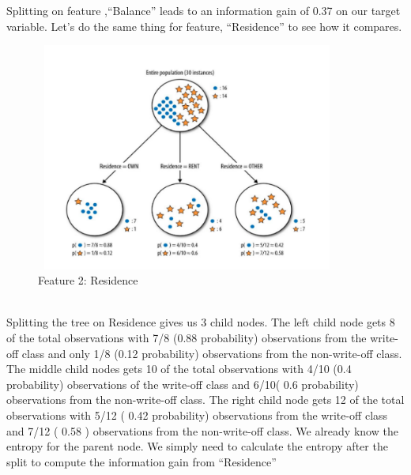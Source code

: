 \documentclass[12pt, A4]{report}
\begin{document}
	Splitting on feature ,“Balance” leads to an information gain of 0.37 on our target variable. Let’s do the same thing for feature, “Residence” to see how it compares.\\ 
	\begin{figure}[h]
		\centering
		\includegraphics[width=10cm, height=7.5cm]{tree2.png}
		\caption{Feature 2: Residence}
	\end{figure}
	\\
	Splitting the tree on Residence gives us 3 child nodes. The left child node gets 8 of the total observations with 7/8 (0.88 probability) observations from the write-off class and only 1/8 (0.12 probability) observations from the non-write-off class. The middle child nodes gets 10 of the total observations with 4/10 (0.4 probability) observations of the write-off class and 6/10( 0.6 probability) observations from the non-write-off class. The right child node gets 12 of the total observations with 5/12 ( 0.42 probability) observations from the write-off class and 7/12 ( 0.58 ) observations from the non-write-off class. We already know the entropy for the parent node. We simply need to calculate the entropy after the split to compute the information gain from “Residence”
\end{document}
